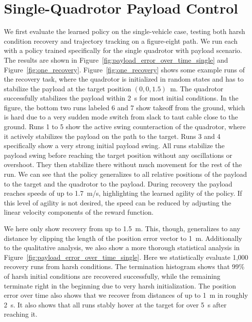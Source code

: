 \section{Single-Quadrotor Payload Control}
We first evaluate the learned policy on the single-vehicle case, testing both harsh condition recovery and trajectory tracking on a figure-eight path. We run each with a policy trained specifically for the single quadrotor with payload scenario. The results are shown in Figure~\ref{fig:payload_error_over_time_single} and Figure~\ref{fig:one_recovery}.
Figure~\ref{fig:one_recovery} shows some example runs of the recovery task, where the quadrotor is initialized in random states and has to stabilize the payload at the target position $(0,0,1.5)$~m. The quadrotor successfully stabilizes the payload within 2~s for most initial conditions. In the figure, the bottom two runs labeled 6 and 7 show takeoff from the ground, which is hard due to a very sudden mode switch from slack to taut cable close to the ground. Runs 1 to 5 show the active swing counteraction of the quadrotor, where it actively stabilizes the payload on the path to the target. Runs 3 and 4 specifically show a very strong initial payload swing. All runs stabilize the payload swing before reaching the target position without any oscillations or overshoot. They then stabilize there without much movement for the rest of the run. We can see that the policy generalizes to all relative positions of the payload to the target and the quadrotor to the payload. During recovery the payload reaches speeds of up to 1.7~m/s, highlighting the learned agility of the policy. If this level of agility is not desired, the speed can be reduced by adjusting the linear velocity components of the reward function.

We here only show recovery from up to 1.5~m. This, though, generalizes to any distance by clipping the length of the position error vector to 1~m. Additionally to the qualitative analysis, we also show a more thorough statistical analysis in Figure~\ref{fig:payload_error_over_time_single}. Here we statistically evaluate 1,000 recovery runs from harsh conditions. The termination histogram shows that 99\% of harsh initial conditions are recovered successfully, while the remaining terminate right in the beginning due to very harsh initialization. The position error over time also shows that we recover from distances of up to 1~m in roughly 2~s. It also shows that all runs stably hover at the target for over 5~s after reaching it.

